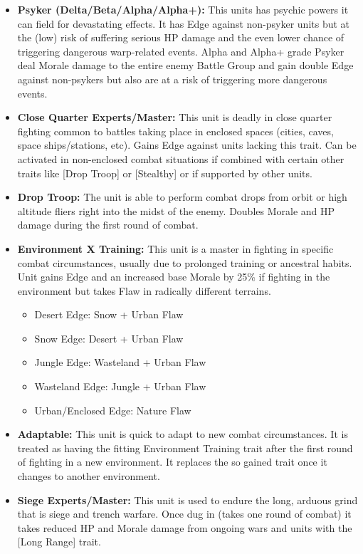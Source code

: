 \begin{itemize}
 	\item \textbf{Psyker (Delta/Beta/Alpha/Alpha+):} This units has psychic powers it can field for devastating effects. It has Edge against non-psyker units but at the (low) risk of suffering serious HP damage and the even lower chance of triggering dangerous warp-related events. Alpha and Alpha+ grade Psyker deal Morale damage to the entire enemy Battle Group and gain double Edge against non-psykers but also are at a risk of triggering more dangerous events.
 	\item \textbf{Close Quarter Experts/Master:} This unit is deadly in close quarter fighting common to battles taking place in enclosed spaces (cities, caves, space ships/stations, etc). Gains Edge against units lacking this trait. Can be activated in non-enclosed combat situations if combined with certain other traits like [Drop Troop] or [Stealthy] or if supported by other units.
 	\item \textbf{Drop Troop:} The unit is able to perform combat drops from orbit or high altitude fliers right into the midst of the enemy. Doubles Morale and HP damage during the first round of combat.
 	\item \textbf{Environment X Training:} This unit is a master in fighting in specific combat circumstances, usually due to prolonged training or ancestral habits. Unit gains Edge and an increased base Morale by 25\% if fighting in the environment but takes Flaw in radically different terrains.
 	\begin{itemize}
 		\item Desert Edge: Snow + Urban Flaw
 		\item Snow Edge: Desert + Urban Flaw
 		\item Jungle Edge: Wasteland + Urban Flaw
 		\item Wasteland Edge: Jungle + Urban Flaw
 		\item Urban/Enclosed Edge: Nature Flaw
 	\end{itemize}
 	\item \textbf{Adaptable:} This unit is quick to adapt to new combat circumstances. It is treated as having the fitting Environment Training trait after the first round of fighting in a new environment. It replaces the so gained trait once it changes to another environment.
 	\item \textbf{Siege Experts/Master:} This unit is used to endure the long, arduous grind that is siege and trench warfare. Once dug in (takes one round of combat) it takes reduced HP and Morale damage from ongoing wars and units with the [Long Range] trait.

\end{itemize}

